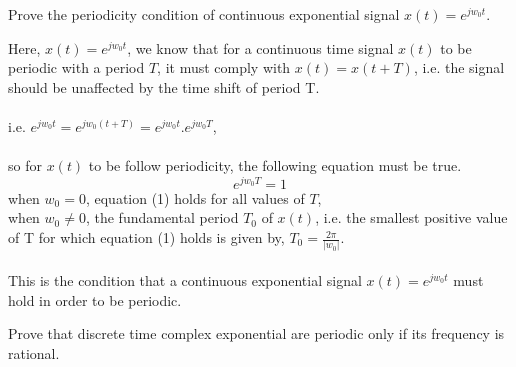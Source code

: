 \documentclass{article}[12 pt]
\begin{document}
\begin{problem}{
Prove the periodicity condition of continuous exponential signal $x(t)=e^{jw_0t}$.
}
\end{problem}
\begin{solution}
{Here, $x(t)=e^{jw_0t}$, we know that for a continuous time signal $x(t)$ to be periodic with a period $T$, it must comply with $x(t)=x(t+T)$, i.e. the signal should be unaffected by the time shift of period T. \\\\
   i.e. $e^{jw_0t}=e^{jw_0(t+T)}=e^{jw_0t}.e^{jw_0T}$,\\\\so for $x(t)$ to be follow periodicity, the following equation must be true.
   \begin{equation}
       e^{jw_0T}=1
   \end{equation}
   when $w_0=0$, equation (1) holds for all values of $T$,\\
   when $w_0\neq0$, the fundamental period $T_0$ of $x(t)$, i.e. the smallest positive value of T for which equation (1) holds is given by,
   $T_0=\frac{2\pi}{|w_0|}$.\\\\
   This is the condition that a continuous exponential signal $x(t)=e^{jw_0t}$ must hold in order to be periodic.}
\end{solution}

\begin{problem}
{Prove that discrete time complex exponential are periodic only if its frequency is rational.}
\end{problem}
\end{document}
